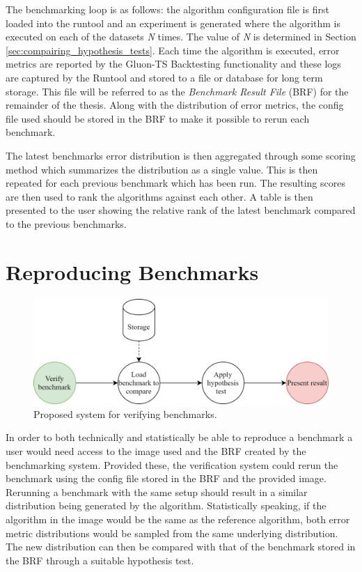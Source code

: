 The benchmarking loop is as follows: the algorithm configuration file is first loaded into the runtool and an experiment is generated where the algorithm is executed on each of the datasets \textit{N} times. The value of \textit{N} is determined in Section \ref{sec:compairing_hypothesis_tests}. Each time the algorithm is executed, error metrics are reported by the Gluon-TS Backtesting functionality and these logs are captured by the Runtool and stored to a file or database for long term storage. This file will be referred to as the \textit{Benchmark Result File} (BRF) for the remainder of the thesis. Along with the distribution of error metrics, the config file used should be stored in the BRF to make it possible to rerun each benchmark.

The latest benchmarks error distribution is then aggregated through some scoring method which summarizes the distribution as a single value. This is then repeated for each previous benchmark which has been run. The resulting scores are then used to rank the algorithms against each other. A table is then presented to the user showing the relative rank of the latest benchmark compared to the previous benchmarks.

\section{Reproducing Benchmarks}
\label{sec:reproduce_benchmarks}
\begin{figure}[h]
    \centering
    \includegraphics[width=\linewidth]{./img/verify_benchmark.png}
    \caption{Proposed system for verifying benchmarks.}
    \label{fig:proposed_validation_system}
\end{figure}

In order to both technically and statistically be able to reproduce a benchmark a user would need access to the image used and the BRF created by the benchmarking system. Provided these, the verification system could rerun the benchmark using the config file stored in the BRF and the provided image. Rerunning a benchmark with the same setup should result in a similar distribution being generated by the algorithm. Statistically speaking, if the algorithm in the image would be the same as the reference algorithm, both error metric distributions would be sampled from the same underlying distribution. The new distribution can then be compared with that of the benchmark stored in the BRF through a suitable hypothesis test.

